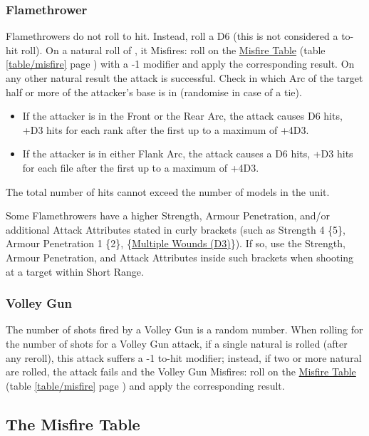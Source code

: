 \subsubsection{Flamethrower}
\label{flamethrower}

Flamethrowers do not roll to hit. Instead, roll a D6 (this is not considered a to-hit roll). On a natural roll of , it Misfires: roll on the \hyperref[the_misfire_table]{Misfire Table} (table \ref{table/misfire} page \pageref{table/misfire}) with a -1 modifier and apply the corresponding result. On any other natural result the attack is successful. Check in which Arc of the target half or more of the attacker's base is in (randomise in case of a tie).
\begin{itemize}[label={-}]
\item If the attacker is in the Front or the Rear Arc, the attack causes D6 hits, +D3 hits for each rank after the first up to a maximum of +4D3.
\item If the attacker is in either Flank Arc, the attack causes a D6 hits, +D3 hits for each file after the first up to a maximum of +4D3.
\end{itemize}
The total number of hits cannot exceed the number of models in the unit.

Some Flamethrowers have a higher Strength, Armour Penetration, and/or additional Attack Attributes stated in curly brackets (such as Strength 4 \{5\}, Armour Penetration 1 \{2\}, \{\hyperref[multiple_wounds]{Multiple Wounds (D3)}\}). If so, use the Strength, Armour Penetration, and Attack Attributes inside such brackets when shooting at a target within Short Range.

\subsubsection{Volley Gun}
\label{volley_gun}

The number of shots fired by a Volley Gun is a random number. When rolling for the number of shots for a Volley Gun attack, if a single natural  is rolled (after any reroll), this attack suffers a -1 to-hit modifier; instead, if two or more natural  are rolled, the attack fails and the Volley Gun Misfires: roll on the \hyperref[the_misfire_table]{Misfire Table} (table \ref{table/misfire} page \pageref{table/misfire}) and apply the corresponding result.

\subsection{The Misfire Table}
\label{the_misfire_table}

